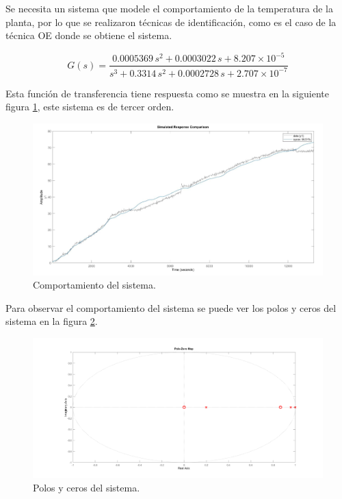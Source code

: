 \documentclass[12pt]{article}
\begin{document}
	Se necesita un sistema que modele el comportamiento de la temperatura de la planta, por lo que se realizaron técnicas de identificación, como es el caso de la técnica OE donde se obtiene el sistema.
	
	
	\begin{equation}
		G(s) = \frac{0.0005369 \, s^2 + 0.0003022 \, s + 8.207 \times 10^{-5}}{s^3 + 0.3314 \, s^2 + 0.0002728 \, s + 2.707 \times 10^{-7}}
	\end{equation}
	
	Esta función de transferencia tiene respuesta como se muestra en la siguiente figura \ref{fig:identificacion}, este sistema es de tercer orden.
	
	
	\begin{figure} [H]
		\centering
		\includegraphics[width=0.8\linewidth]{imagenes/identificacion}
		\caption{Comportamiento del sistema.}
		\label{fig:identificacion}
	\end{figure}
	Para observar el comportamiento del sistema se puede ver los polos y ceros del sistema en la figura \ref{polos y ceros}.
	
	\begin{figure} [h]
		\centering
		\includegraphics[width=1\linewidth]{imagenes/Polos y ceros}
		\caption{Polos y ceros del sistema.}
		\label{polos y ceros}
	\end{figure}
	\newpage
\end{document}
